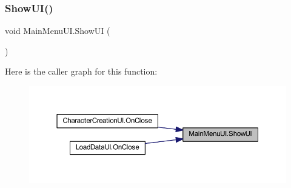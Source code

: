 \subsubsection{\texorpdfstring{ShowUI()}{ShowUI()}}
{\footnotesize\ttfamily void Main\+Menu\+U\+I.\+Show\+UI (\begin{DoxyParamCaption}{ }\end{DoxyParamCaption})}

Here is the caller graph for this function\+:\nopagebreak
\begin{figure}[H]
\begin{center}
\leavevmode
\includegraphics[width=350pt]{class_main_menu_u_i_ab70d817a22e65d2258cfd0d9a48404a8_icgraph}
\end{center}
\end{figure}
